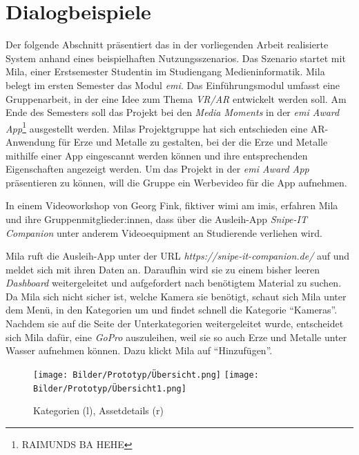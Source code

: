 \chapter{Dialogbeispiele}
\label{chapter-dialogbeispiel}

Der folgende Abschnitt präsentiert das in der vorliegenden Arbeit realisierte
System anhand eines beispielhaften Nutzungsszenarios. Das Szenario startet mit
Mila, einer Erstsemester Studentin im Studiengang Medieninformatik. Mila belegt
im ersten Semester das Modul \textit{\ac{emi}}. Das Einführungsmodul umfasst
eine Gruppenarbeit, in der eine Idee  zum Thema \textit{VR/AR} entwickelt werden
soll. Am Ende des Semesters soll das Projekt bei den \textit{Media Moments} in
der \textit{\ac{emi} Award App}\footnote{RAIMUNDS BA HEHE} ausgestellt werden.
Milas Projektgruppe hat sich entschieden eine AR-Anwendung für Erze und Metalle
zu gestalten, bei der die Erze und Metalle mithilfe einer App eingescannt werden
können und ihre entsprechenden Eigenschaften angezeigt werden. Um das Projekt in
der \textit{\ac{emi} Award App} präsentieren zu können, will die Gruppe ein
Werbevideo für die App aufnehmen.

In einem Videoworkshop von Georg Fink, fiktiver \ac{wimi} am \ac{imis}, erfahren
Mila und ihre Gruppenmitglieder:innen, dass über die Ausleih-App
\textit{Snipe-IT Companion} unter anderem Videoequipment an Studierende
verliehen wird.

Mila ruft die Ausleih-App unter der URL \textit{https://snipe-it-companion.de/}
auf und meldet sich mit ihren Daten an. Daraufhin wird sie zu einem
bisher leeren \textit{Dashboard} weitergeleitet und aufgefordert nach benötigtem
Material zu suchen. Da Mila sich nicht sicher ist, welche Kamera sie benötigt,
schaut sich Mila unter dem Menü, in den Kategorien um und findet schnell die
Kategorie \enquote{Kameras}. Nachdem sie auf die Seite der Unterkategorien
weitergeleitet wurde, entscheidet sich Mila dafür, eine \textit{GoPro}
auszuleihen, weil sie so auch Erze und Metalle unter Wasser aufnehmen können.
Dazu klickt Mila auf \enquote{Hinzufügen}.

\begin{figure}[h]
    \centering
    \texttt{[image: Bilder/Prototyp/Übersicht.png]}\hspace{2em}
    \texttt{[image: Bilder/Prototyp/Übersicht1.png]}
    \label{fig:p4}
    \caption[Mockup: Kategorien, Assets, Assetdetails]{Kategorien (l), Assetdetails (r)}
\end{figure}

